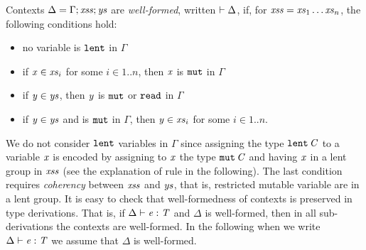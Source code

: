 Contexts $\Delta=\Gamma;\mathit{xss};\mathit{ys}$ are \emph{well-formed}, written $\vdash\Delta$, 
if, for $\mathit{xss}=\mathit{xs}_1\ldots\mathit{xs}_n$, the following conditions hold:
\begin{itemize}
\item no variable is $\texttt{lent}$  in $\Gamma$
\item if  $\mathit{x}\in\mathit{xs}_i$ for some $i\in 1..n$,  then $\mathit{x}$ is $\texttt{mut}$ in $\Gamma$
\item if $\mathit{y}\in\mathit{ys}$, then  $\mathit{y}$ is $\texttt{mut}$ or $\texttt{read}$  in $\Gamma$
\item if $\mathit{y}\in\mathit{ys}$ and is $\texttt{mut}$ in $\Gamma$, then $\mathit{y}\in\mathit{xs}_i$ for some $i\in 1..n$.
\end{itemize}
We do not consider $\texttt{lent}$ variables in $\Gamma$ since assigning the type $\texttt{lent}\,\mathit{C}$ to a variable $\mathit{x}$  is encoded by assigning to $\mathit{x}$ the type $\texttt{mut}\,\mathit{C}$ and having $\mathit{x}$ in a lent group in $\mathit{xss}$ (see the explanation of rule  in the following). The  last condition requires \emph{coherency} between $\mathit{xss}$ and $\mathit{ys}$, that is, restricted mutable variable are in a lent group. It is easy to check that well-formedness of contexts is preserved in type derivations. That is, if $\Delta\vdash \mathit{e}:\mathit{T}$ and ${\Delta}$ is well-formed, then in all sub-derivations the contexts are well-formed. In the following when we write 
$\Delta\vdash \mathit{e}:\mathit{T}$ we assume that ${\Delta}$ is well-formed.

